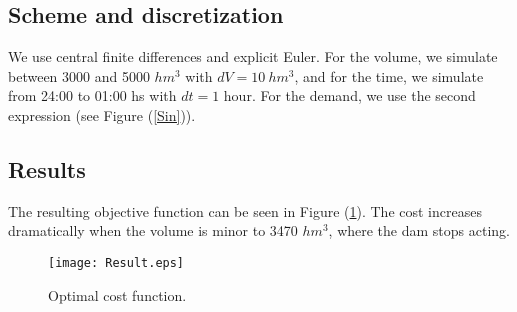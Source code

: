 \documentclass[12pt]{article}
\theoremstyle{definition}
\theoremstyle{remark}
\begin{document}
\subsection{Scheme and discretization}

We use central finite differences and explicit Euler. For the volume, we simulate between 3000 and 5000 $hm^3$ with $dV=10\ hm^3$, and for the time, we simulate from 24:00 to 01:00 hs with $dt=1$ hour. For the demand, we use the second expression (see Figure (\ref{Sin})).

\subsection{Results}

The resulting objective function can be seen in Figure (\ref{Result}). The cost increases dramatically when the volume is minor to 3470 $hm^3$, where the dam stops acting.
\begin{figure}[ht!]
\centering
\texttt{[image: Result.eps]}
\caption{Optimal cost function.}
\label{Result}
\end{figure}
\end{document}
